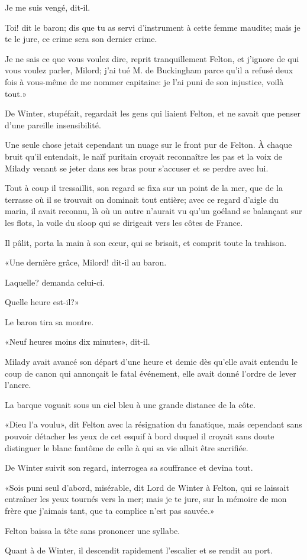 \speak  Je me suis vengé, dit-il. 

\speak  Toi! dit le baron; dis que tu as servi d'instrument à cette femme maudite; mais je te le jure, ce crime sera son dernier crime. 

\speak  Je ne sais ce que vous voulez dire, reprit tranquillement Felton, et j'ignore de qui vous voulez parler, Milord; j'ai tué M. de Buckingham parce qu'il a refusé deux fois à vous-même de me nommer capitaine: je l'ai puni de son injustice, voilà tout.» 

De Winter, stupéfait, regardait les gens qui liaient Felton, et ne savait que penser d'une pareille insensibilité. 

Une seule chose jetait cependant un nuage sur le front pur de Felton. À chaque bruit qu'il entendait, le naïf puritain croyait reconnaître les pas et la voix de Milady venant se jeter dans ses bras pour s'accuser et se perdre avec lui. 

Tout à coup il tressaillit, son regard se fixa sur un point de la mer, que de la terrasse où il se trouvait on dominait tout entière; avec ce regard d'aigle du marin, il avait reconnu, là où un autre n'aurait vu qu'un goéland se balançant sur les flots, la voile du sloop qui se dirigeait vers les côtes de France. 

Il pâlit, porta la main à son cœur, qui se brisait, et comprit toute la trahison. 

«Une dernière grâce, Milord! dit-il au baron. 

\speak  Laquelle? demanda celui-ci. 

\speak  Quelle heure est-il?» 

Le baron tira sa montre. 

«Neuf heures moins dix minutes», dit-il. 

Milady avait avancé son départ d'une heure et demie dès qu'elle avait entendu le coup de canon qui annonçait le fatal événement, elle avait donné l'ordre de lever l'ancre. 

La barque voguait sous un ciel bleu à une grande distance de la côte. 

«Dieu l'a voulu», dit Felton avec la résignation du fanatique, mais cependant sans pouvoir détacher les yeux de cet esquif à bord duquel il croyait sans doute distinguer le blanc fantôme de celle à qui sa vie allait être sacrifiée. 

De Winter suivit son regard, interrogea sa souffrance et devina tout. 

«Sois puni seul d'abord, misérable, dit Lord de Winter à Felton, qui se laissait entraîner les yeux tournés vers la mer; mais je te jure, sur la mémoire de mon frère que j'aimais tant, que ta complice n'est pas sauvée.» 

Felton baissa la tête sans prononcer une syllabe. 

Quant à de Winter, il descendit rapidement l'escalier et se rendit au port. 